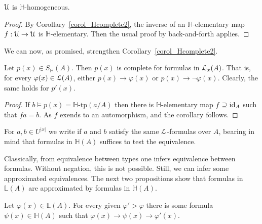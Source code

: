 \documentclass[11pt,oneside]{amsart}
\renewcommand*{\emph}[1]{%
   \smash{\tikz[baseline]\node[rectangle, fill=teal!25, rounded corners, inner xsep=0.5ex, inner ysep=0.2ex, anchor=base, minimum height = 2.7ex]{#1};}}
\begin{document}
\begin{proposition}
  ${\EuScript U}$ is $\mathds{H}$-homogeneous.
\end{proposition}

\begin{proof}
  By Corollary~\ref{corol_Hcomplete2}, the inverse of an $\mathds{H}$-elementary map $f:{\EuScript U}\to{\EuScript U}$ is $\mathds{H}$-elementary.
  Then the usual proof by back-and-forth applies.
\end{proof}

We can now, as promised, strengthen Corollary~\ref{corol_Hcomplete2}.

\begin{corollary}\label{corol_Lcomplete}
  Let $p(x)\in S_\mathds{H}(A)$.
  Then $p(x)$ is complete for formulas in ${\EuScript L}_x(A)$.
  That is, for every $\varphi(x)\in{\EuScript L}(A)$, either $p(x)\rightarrow\varphi(x)$ or $p(x)\rightarrow\neg\varphi(x)$.
  Clearly, the same holds for $p'(x)$.
\end{corollary}

\begin{proof}
  If $b\models p(x)=\mathds{H}\mbox{-tp}(a/A)$ then there is $\mathds{H}$-elementary map $f\supseteq{\rm id}_A$ such that $fa=b$.
  As $f$ exends to an automorphism, and the corollary follows.
\end{proof}

For $a,b\in U^{|x|}$ we write \emph{$a\equiv_Ab$\/} if $a$ and $b$ satisfy the same ${\EuScript L}$-formulas over $A$, bearing in mind that formulas in $\mathds{H}(A)$ suffices to test the equivalence.

Classically, from equivalence between types one infers equivalence between formulas.
Without negation, this is not possible.
Still, we can infer some approximated equivalences.
The next two propositions show that formulas in $\mathds{L}(A)$ are approximated by formulas in $\mathds{H}(A)$.

\begin{proposition}\label{prop_LHapprox1}
  Let $\varphi(x)\in\mathds{L}(A)$.
  For every given $\varphi'>\varphi$ there is some formula $\psi(x)\in\mathds{H}(A)$ such that $\varphi(x)\rightarrow\psi(x)\rightarrow\varphi'(x)$.
\end{proposition}
\end{document}
